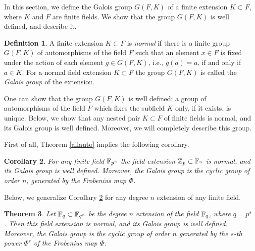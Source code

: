 \documentclass[11pt]{article}
\theoremstyle{plain}
\newtheorem{theorem}{Theorem}[section]
\newtheorem{corollary}[theorem]{Corollary}
\theoremstyle{definition}
\newtheorem{definition}[theorem]{Definition}
\begin{document}
In this section, we define the Galois group $G(F,K)$ of a finite extension $K\subset F$, where $K$ and $F$ are finite fields. We show that the group $G(F,K)$ is well defined, and  describe it.

\begin{definition}\label{normal} A finite  extension $K\subset F$ is {\it normal} if there is a finite group $G(F,K)$ of automorphisms  of the field $F$ such that an element $x\in F$ is fixed under the action of each element $g\in G(F,K)$, i.e., $g(a)=a$, if and only if $a\in K$. For a normal field extension $K\subset F$ the group $G(F,K)$ is called the {\it Galois group} of the extension.
\end{definition}

 One can show that the group $G(F,K)$ is well defined: a group of automorphisms of the field $F$ which fixes the subfield $K$ only, if it exists, is unique. Below, we show that any nested pair $K\subset F$  of finite fields is normal, and  its Galois  group is well defined. Moreover, we will completely describe this  group.

 First of all, Theorem \ref{allauto} implies the following corollary.

 \begin{corollary}\label{aalfirst} For any finite field $\Bbb F_{p^n}$ the field extension $\Bbb Z_p\subset \Bbb F_{^n}$ is normal, and its Galois group   is well defined. Moreover, the Galois group is the cyclic group of order $n$, generated by the Frobenius map $\Phi$.
 \end{corollary}

 Below, we generalize Corollary \ref{aalfirst} for any degree $n$ extension of any  finite  field.

 \begin{theorem}\label{galoiagroup} Let  $\Bbb F_q\subset \Bbb F_{q^n}$ be the degree $n$ extension of the field $\Bbb F_q$, where  $q=p^s$. Then this field extension  is normal, and its Galois group  is well defined. Moreover, the Galois group is the cyclic group of order $n$ generated by the $s$-th power $\Phi^s$ of the Frobenius map $\Phi$.
  \end{theorem}
\end{document}
